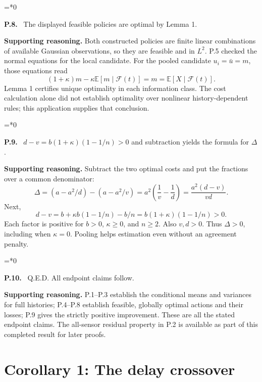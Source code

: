 \documentclass[12pt,letterpaper]{article}
\newcommand{\E}{\mathbb E}
\newcommand{\F}{\mathcal F}
\newenvironment{proofstep}[2]{%
  \begin{list}{}{\leftmargin=\dimexpr 0.17in*#2\relax%
  \setlength{\rightmargin}{0pt}\setlength{\topsep}{5pt}\setlength{\parsep}{2pt}}%
  \item[]\textbf{\textcolor{ink}{#1.}}\ }{\end{list}}
\begin{document}
\begin{proofstep}{P.8}{0}
\label{step:P.8}
The displayed feasible policies are optimal by Lemma 1.

\textbf{Supporting reasoning.}
Both constructed policies are finite linear combinations of available Gaussian observations, so they are feasible and in $L^2$. P.5 checked the normal equations for the local candidate. For the pooled candidate $u_i=\bar u=m$, those equations read
\[
(1+\kappa)m-\kappa\E[m\mid\F(t)]=m=\E[X\mid\F(t)].
\]
Lemma 1 certifies unique optimality in each information class. The cost calculation alone did not establish optimality over nonlinear history-dependent rules; this application supplies that conclusion.
\par{}
\end{proofstep}

\begin{proofstep}{P.9}{0}
\label{step:P.9}
$d-v=b(1+\kappa)(1-1/n)>0$ and subtraction yields the formula for $\Delta$.

\textbf{Supporting reasoning.}
Subtract the two optimal costs and put the fractions over a common denominator:
\[
\Delta=(a-a^2/d)-(a-a^2/v)
=a^2\left(\frac1v-\frac1d\right)=\frac{a^2(d-v)}{vd}.
\]
Next,
\[
d-v=b+\kappa b(1-1/n)-b/n=b(1+\kappa)(1-1/n)>0.
\]
Each factor is positive for $b>0$, $\kappa\ge0$, and $n\ge2$. Also $v,d>0$. Thus $\Delta>0$, including when $\kappa=0$. Pooling helps estimation even without an agreement penalty.
\par{}
\end{proofstep}

\begin{proofstep}{P.10}{0}
\label{step:P.10}
Q.E.D. All endpoint claims follow.

\textbf{Supporting reasoning.}
P.1--P.3 establish the conditional means and variances for full histories; P.4--P.8 establish feasible, globally optimal actions and their losses; P.9 gives the strictly positive improvement. These are all the stated endpoint claims. The all-sensor residual property in P.2 is available as part of this completed result for later proofs.
\par{}
\end{proofstep}

\clearpage
\section{Corollary 1: The delay crossover}\label{contract-D}
\end{document}
